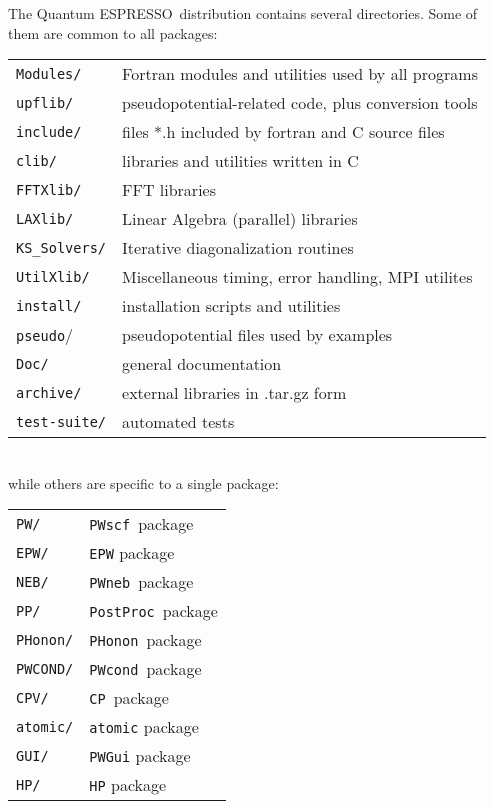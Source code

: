 \documentclass[12pt,a4paper]{article}
\def\qe{{\sc Quantum ESPRESSO}}
\def\PWscf{\texttt{PWscf}}
\def\PHonon{\texttt{PHonon}}
\def\CP{\texttt{CP}}
\def\PostProc{\texttt{PostProc}}
\def\NEB{\texttt{PWneb}}
\begin{document}

The \qe\ distribution contains several directories. Some of them are
common to all packages:

\begin{tabular}{ll}
\texttt{Modules/} &  Fortran modules and utilities used by all programs\\
\texttt{upflib/}  &  pseudopotential-related code, plus conversion tools\\
\texttt{include/} &  files *.h included by fortran and C source files\\
\texttt{clib/}    &  libraries and utilities written in C\\
\texttt{FFTXlib/} &  FFT libraries\\
\texttt{LAXlib/}  &  Linear Algebra (parallel) libraries\\
\texttt{KS\_Solvers/}  &  Iterative diagonalization routines\\
\texttt{UtilXlib/}&  Miscellaneous timing, error handling, MPI utilites\\
\texttt{install/} &  installation scripts and utilities\\
\texttt{pseudo}/  &  pseudopotential files used by examples\\
\texttt{Doc/}     &  general documentation\\
\texttt{archive/} &  external libraries in .tar.gz form\\
\texttt{test-suite/} &  automated tests\\
\end{tabular}
\\
while others are specific to a single package:

\begin{tabular}{ll}
\texttt{PW/}      & \PWscf\ package\\
\texttt{EPW/}     & \texttt{EPW} package\\
\texttt{NEB/}     & \NEB\ package\\
\texttt{PP/}      & \PostProc\ package\\
\texttt{PHonon/}  & \PHonon\ package\\
\texttt{PWCOND/}  & \texttt{PWcond}\ package\\
\texttt{CPV/}     & \CP\ package\\
\texttt{atomic/}  & \texttt{atomic} package\\
\texttt{GUI/}     & \texttt{PWGui} package\\
\texttt{HP/}      & \texttt{HP} package
\end{tabular}
\end{document}
